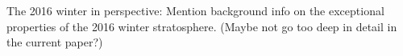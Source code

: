 The 2016 winter in perspective: 
Mention background info on the exceptional properties of the 2016 winter stratosphere. (Maybe not go too deep in detail in the current paper?)